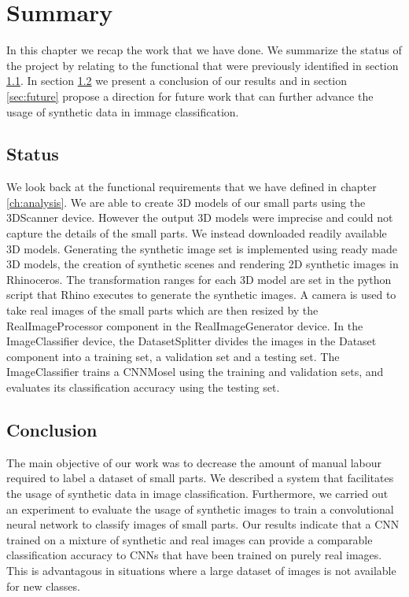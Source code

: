\chapter{Summary}\label{ch:summary}

In this chapter we recap the work that we have done. We summarize the status of the project by relating to the functional that were previously identified in section \ref{sec:status}. In section \ref{sec:conclusion} we present a conclusion of our results and in section \ref{sec:future} propose a direction for future work that can further advance the usage of synthetic data in immage classification.


\section{Status}\label{sec:status}

We look back at the functional requirements that we have defined in chapter \ref{ch:analysis}. We are able to create 3D models of our small parts using the 3DScanner device. However the output 3D models were imprecise and could not capture the details of the small parts. We instead downloaded readily available 3D models. Generating the synthetic image set is implemented using ready made 3D models, the creation of synthetic scenes and rendering 2D synthetic images in Rhinoceros. The transformation ranges for each 3D model are set in the python script that Rhino executes to generate the synthetic images. A camera is used to take real images of the small parts which are then resized by the RealImageProcessor component in the RealImageGenerator device. In the ImageClassifier device, the DatasetSplitter divides the images in the Dataset component into a training set, a validation set and a testing set. The ImageClassifier trains a CNNMosel using the training and validation sets, and evaluates its classification accuracy using the testing set.


\section{Conclusion}\label{sec:conclusion}

The main objective of our work was to decrease the amount of manual labour required to label a dataset of small parts. We described a system that facilitates the usage of synthetic data in image classification. Furthermore, we carried out an experiment to evaluate the usage of synthetic images to train a convolutional neural network to classify images of small parts. Our results indicate that a CNN trained on a mixture of synthetic and real images can provide a comparable classification accuracy to CNNs that have been trained on purely real images. This is advantagous in situations where a large dataset of images is not available for new classes.


